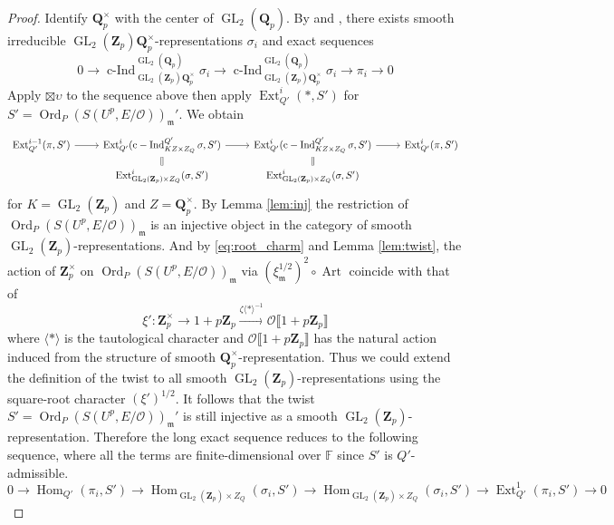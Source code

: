 \documentclass[leqno]{amsart}
\theoremstyle{definition}
\theoremstyle{remark}
\newcommand{\oo}{\mathcal{O}}
\newcommand{\fF}{\mathbb{F}} %
\newcommand{\Qp}{\mathbf{Q}_p}
\newcommand{\Zp}{\mathbf{Z}_p}
\DeclareMathOperator{\Hom}{Hom}
\DeclareMathOperator{\Ext}{Ext}
\DeclareMathOperator{\cInd}{c-Ind}
\DeclareMathOperator{\GL}{GL}
\DeclareMathOperator{\Art}{Art}
\newcommand{\fm}{\mathfrak{m}}
\DeclareMathOperator{\Ord}{Ord} %
\begin{document}
\begin{proof}
Identify $\Qp^\times$ with the center of $\GL_2(\Qp)$.
By \cite[Thm 33]{barthel} and \cite[Thm 19]{barthel}, 
there exists
smooth irreducible 
$\GL_2(\Zp)\Qp^\times$-representations $\sigma_i$
and exact sequences
\begin{equation}
	0\to 
	\cInd_{\GL_2(\Zp)\Qp^\times}^{\GL_2(\Qp)}\sigma_i\to
	\cInd_{\GL_2(\Zp)\Qp^\times}^{\GL_2(\Qp)}\sigma_i\to
	\pi_i\to 0
\end{equation}
Apply $\boxtimes\upsilon$ to the sequence above
then apply $\Ext^i_{Q'}(*,S')$
for $S'=\Ord_P(S(U^p,E/\oo))_{\fm}'$.
We obtain
\begin{equation*}
    \begin{tikzcd}[row sep=2ex]
	    \Ext^{i-1}_{Q'}
	    (\pi, S')\arrow[r] &
	    \Ext^{i}_{Q'}
        (\cInd_{KZ\times Z_Q}^{Q'}\sigma, S')
	    \arrow[r] \arrow[d,equal] &
	    \Ext^{i}_{Q'}
        (\cInd_{KZ\times Z_Q}^{Q'}\sigma, S')
	    \arrow[r] \arrow[d,equal] &
	    \Ext^{i}_{Q'}(\pi, S')\\ 
	 & \Ext^i_{\GL_2(\Zp)\times Z_Q}(\sigma ,S') &
	    \Ext^i_{\GL_2(\Zp)\times Z_Q}(\sigma ,S') &
    \end{tikzcd}
\end{equation*}
for $K=\GL_2(\Zp)$ and $Z=\Qp^\times$.
By Lemma \ref{lem:inj}
the restriction of $\Ord_P(S(U^p,E/\oo))_\fm$
is an injective object 
in the category of smooth $\GL_2(\Zp)$-representations.
And by \eqref{eq:root_charm} and Lemma \ref{lem:twist},
the action of $\Zp^\times$ on 
$\Ord_P(S(U^p,E/\oo))_\fm$ via 
$(\xi_{\fm}^{1/2})^2\circ\Art$
coincide with that of 
\[
    \xi'\colon 
    \Zp^\times\to 1+p\Zp\xrightarrow{\zeta\langle*\rangle^{-1}}
    \oo\llbracket 1+p\Zp\rrbracket
\]
where $\langle*\rangle$ is the tautological character
and $\oo\llbracket 1+p\Zp\rrbracket$ 
has the natural action 
induced from the structure 
of smooth $\Qp^\times$-representation.
Thus we could extend the definition of the twist 
to all smooth $\GL_2(\Zp)$-representations
using the square-root character $(\xi')^{1/2}$.
It follows that 
the twist $S'=\Ord_P(S(U^p,E/\oo))_\fm'$
is still injective
as a smooth $\GL_2(\Zp)$-representation.
Therefore the long exact sequence reduces to 
the following sequence, where
all the terms are finite-dimensional over $\fF$
since $S'$ is $Q'$-admissible.
\begin{equation*}
	0 \to \Hom_{Q'}(\pi_i,S')\to 
	\Hom_{\GL_2(\Zp)\times Z_Q}(\sigma_i,S')\to 
	\Hom_{\GL_2(\Zp)\times Z_Q}(\sigma_i,S')\to 
	\Ext^1_{Q'}(\pi_i,S')\to 0
\end{equation*}




\end{proof}
\end{document}
